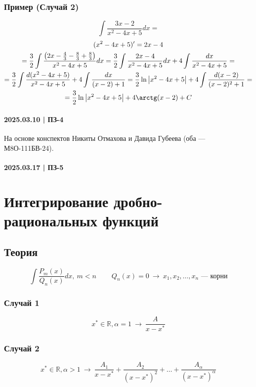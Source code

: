 \documentclass{article}
\begin{document}
\subsubsection{Пример (Случай 2)}
\[
    \int \frac{3x - 2}{x^2 - 4x + 5} dx = 
\]
\begin{gather*}
    (x^2 - 4x + 5)' = 2x - 4 \\
    = \frac{3}{2} \int \frac{\left(2x - \frac{4}{3} - \frac{8}{3} + \frac{8}{3}\right)}{x^2 - 4x + 5} dx =
      \frac{3}{2} \int \frac{2x - 4}{x^2 - 4x + 5} dx + 4 \int \frac{dx}{x^2 - 4x + 5} = \\
    = \frac{3}{2} \int \frac{d(x^2 - 4x + 5)}{x^2 - 4x + 5} + 4 \int \frac{dx}{(x - 2) + 1} =
      \frac{3}{2} \ln \left|x^2 - 4x + 5\right| + 4 \int \frac{d(x - 2)}{(x - 2)^2 + 1} = \\
    = \frac{3}{2} \ln \left|x^2 - 4x + 5\right| + 4 \arctg (x - 2) + C
\end{gather*}




\newpage
\paragraph{2025.03.10 | ПЗ-4}
На основе конспектов Никиты Отмахова и Давида Губеева (оба — М8О-111БВ-24).




\newpage
\paragraph{2025.03.17 | ПЗ-5}

\section{Интегрирование дробно-рациональных функций}

\subsection{Теория}
\[
    \int \frac{P_m(x)}{Q_n(x)} dx,~ m < n ~~~~~~~~~~
    Q_n(x) = 0 ~\rightarrow~ x_1, x_2, \dots, x_n \text{ --- корни}
\]
\subsubsection{Случай 1}
\[
    x^* \in \mathbb{R}, \alpha = 1 ~\rightarrow~ 
    \frac{A}{x - x^*}
\]
\subsubsection{Случай 2}
\[
    x^* \in \mathbb{R}, \alpha > 1 ~\rightarrow~ 
    \frac{A_1}{x - x^*} + \frac{A_2}{(x - x^*)^2} + \dots + \frac{A_{\alpha}}{(x - x^*)^{\alpha}}
\]
\end{document}
